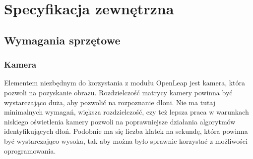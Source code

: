 

\chapter{Specyfikacja zewnętrzna}



\section{Wymagania sprzętowe}
\subsection{Kamera}
\quad Elementem niezbędnym do korzystania z modułu OpenLeap jest kamera, która pozwoli na pozyskanie obrazu. Rozdzielczość matrycy kamery powinna być wystarczająco duża, aby pozwolić na rozpoznanie dłoni. Nie ma tutaj minimalnych wymagań, większa rozdzielczość, czy też lepsza praca w warunkach niskiego oświetlenia kamery pozwoli na poprawniejsze działania algorytmów identyfikujących dłoń. Podobnie ma się liczba klatek na sekundę, która powinna być wystarczająco wysoka, tak aby można było sprawnie korzystać z możliwości oprogramowania. 

